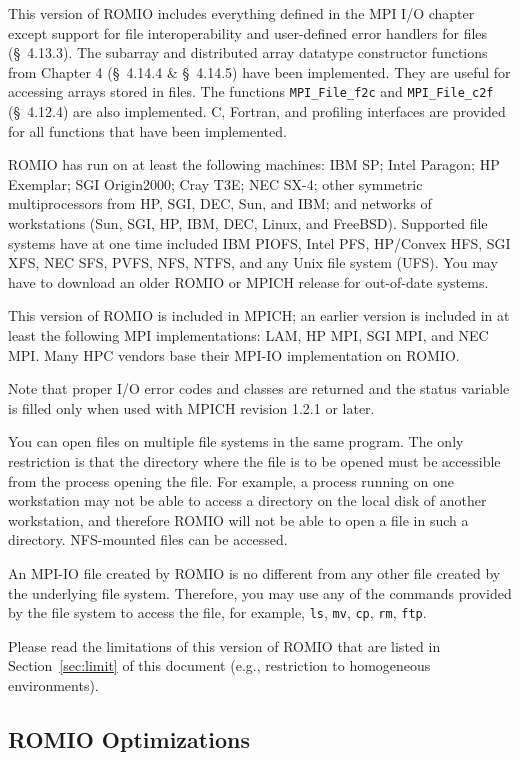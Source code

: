 This version of ROMIO includes everything defined in the MPI I/O
chapter except support for file interoperability and
user-defined error handlers for files (\S~4.13.3).  The subarray and
distributed array datatype constructor functions from Chapter 4
(\S~4.14.4 \& \S~4.14.5) have been implemented. They are useful for
accessing arrays stored in files. The functions {\tt MPI\_File\_f2c}
and {\tt MPI\_File\_c2f} (\S~4.12.4) are also implemented.  C,
Fortran, and profiling interfaces are provided for all functions that
have been implemented.

ROMIO has run on at least the following machines: IBM SP; Intel
Paragon; HP Exemplar; SGI Origin2000; Cray T3E; NEC SX-4; other
symmetric multiprocessors from HP, SGI, DEC, Sun, and IBM; and networks of
workstations (Sun, SGI, HP, IBM, DEC, Linux, and FreeBSD).  Supported file
systems have at one time included IBM PIOFS, Intel PFS, HP/Convex HFS, SGI XFS,
NEC SFS, PVFS, NFS, NTFS, and any Unix file system (UFS).  You may have to
download an older ROMIO or MPICH release for out-of-date systems.


This version of ROMIO is included in MPICH; an earlier version
is included in at least the following MPI implementations: LAM, HP MPI, SGI
MPI, and NEC MPI. Many HPC vendors base their MPI-IO implementation on
ROMIO.

Note that proper I/O error codes and classes are returned and the status
variable is filled only when used with MPICH revision 1.2.1 or later.

You can open files on multiple file systems in the same program. The
only restriction is that the directory where the file is to be opened
must be accessible from the process opening the file. For example, a
process running on one workstation may not be able to access a
directory on the local disk of another workstation, and therefore
ROMIO will not be able to open a file in such a directory. NFS-mounted
files can be accessed.

An MPI-IO file created by ROMIO is no different from any other file
created by the underlying file system. Therefore, you may use any of
the commands provided by the file system to access the file, for example,
{\tt ls}, {\tt mv}, {\tt cp}, {\tt rm}, {\tt ftp}.

Please read the limitations of this version of ROMIO that are listed
in Section~\ref{sec:limit} of this document (e.g., restriction to homogeneous
environments). 

\subsection{ROMIO Optimizations}
\label{sec:opt}

